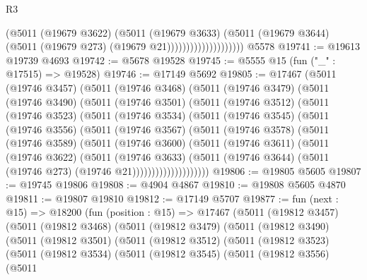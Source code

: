 \begin{lexlean}{R3}
\begin{coremodule}
                                  (@5011
                                    (@19679 @3622)
                                    (@5011
                                      (@19679 @3633)
                                      (@5011
                                        (@19679 @3644)
                                        (@5011 (@19679 @273) (@19679 @21))))))))))))))))))))
    @5578
@19741 := @19613 @19739 @4693
@19742 := @5678 @19528
@19745 := @5555 @15 (fun ("_" : @17515) => @19528)
@19746 := @17149 @5692
@19805 := @17467
    (@5011
      (@19746 @3457)
      (@5011
        (@19746 @3468)
        (@5011
          (@19746 @3479)
          (@5011
            (@19746 @3490)
            (@5011
              (@19746 @3501)
              (@5011
                (@19746 @3512)
                (@5011
                  (@19746 @3523)
                  (@5011
                    (@19746 @3534)
                    (@5011
                      (@19746 @3545)
                      (@5011
                        (@19746 @3556)
                        (@5011
                          (@19746 @3567)
                          (@5011
                            (@19746 @3578)
                            (@5011
                              (@19746 @3589)
                              (@5011
                                (@19746 @3600)
                                (@5011
                                  (@19746 @3611)
                                  (@5011
                                    (@19746 @3622)
                                    (@5011
                                      (@19746 @3633)
                                      (@5011
                                        (@19746 @3644)
                                        (@5011 (@19746 @273) (@19746 @21))))))))))))))))))))
@19806 := @19805 @5605
@19807 := @19745 @19806
@19808 := @4904 @4867
@19810 := @19808 @5605 @4870
@19811 := @19807 @19810
@19812 := @17149 @5707
@19877 := fun (next : @15) =>
  @18200
    (fun (position : @15) =>
    @17467
      (@5011
        (@19812 @3457)
        (@5011
          (@19812 @3468)
          (@5011
            (@19812 @3479)
            (@5011
              (@19812 @3490)
              (@5011
                (@19812 @3501)
                (@5011
                  (@19812 @3512)
                  (@5011
                    (@19812 @3523)
                    (@5011
                      (@19812 @3534)
                      (@5011
                        (@19812 @3545)
                        (@5011
                          (@19812 @3556)
                          (@5011

\end{coremodule}
\end{lexlean}
